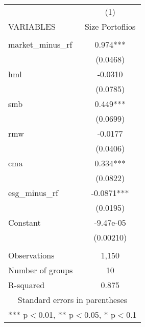 \documentclass[]{article}
\begin{document}
\begin{tabular}{lc} \hline
 & (1) \\
VARIABLES & Size Portoflios \\ \hline
 &  \\
market\_minus\_rf & 0.974*** \\
 & (0.0468) \\
hml & -0.0310 \\
 & (0.0785) \\
smb & 0.449*** \\
 & (0.0699) \\
rmw & -0.0177 \\
 & (0.0406) \\
cma & 0.334*** \\
 & (0.0822) \\
esg\_minus\_rf & -0.0871*** \\
 & (0.0195) \\
Constant & -9.47e-05 \\
 & (0.00210) \\
 &  \\
Observations & 1,150 \\
Number of groups & 10 \\
 R-squared & 0.875 \\ \hline
\multicolumn{2}{c}{ Standard errors in parentheses} \\
\multicolumn{2}{c}{ *** p$<$0.01, ** p$<$0.05, * p$<$0.1} \\
\end{tabular}
\end{document}

